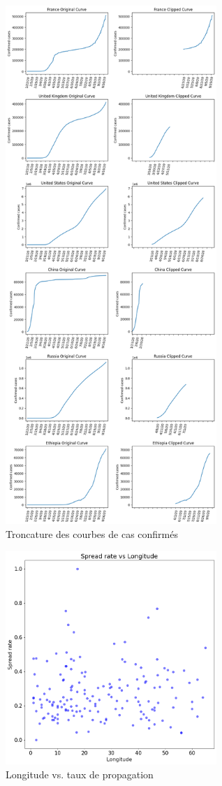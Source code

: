 \documentclass[12pt]{iEEEtran}
\begin{document}
\begin{figure}[h]
    \centering
    \includegraphics[width=8cm]{img/clip_full.png}
    \caption{Troncature des courbes de cas confirmés}
    \label{fig:clip_full}
\end{figure}

\begin{figure}[h]
    \centering
    \includegraphics[width=8cm]{img/spread_lon.png}
    \caption{Longitude vs. taux de propagation}
    \label{fig:spread_lon}
\end{figure}
\end{document}
